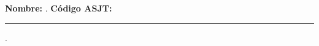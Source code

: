 \textbf{Nombre:} \hrulefill. \textbf{ Código ASJT:} \rule{2cm}{0.1mm}.
\vspace{-4mm}

\thispagestyle{first-page-style}

